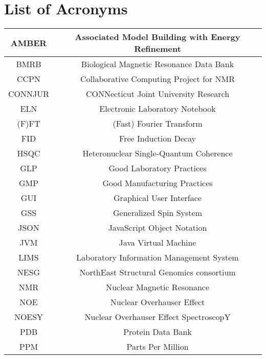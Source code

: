 \chapter*{List of Acronyms}

\begin{center}
    \begin{longtable}{ | c || c | }
    \hline
    AMBER   & Associated Model Building with Energy Refinement  \\  \hline
    BMRB    & Biological Magnetic Resonance Data Bank   \\  \hline 
    CCPN    & Collaborative Computing Project for NMR   \\  \hline 
    CONNJUR & CONNecticut Joint University Research     \\  \hline 
    ELN     & Electronic Laboratory Notebook            \\  \hline 
    (F)FT   & (Fast) Fourier Transform                  \\  \hline 
    FID     & Free Induction Decay                      \\  \hline 
    HSQC    & Heteronuclear Single-Quantum Coherence    \\  \hline 
    GLP     & Good Laboratory Practices                 \\  \hline 
    GMP     & Good Manufacturing Practices              \\  \hline 
    GUI     & Graphical User Interface                  \\  \hline 
    GSS     & Generalized Spin System                   \\  \hline
    JSON    & JavaScript Object Notation                \\  \hline 
    JVM     & Java Virtual Machine                      \\  \hline 
    LIMS    & Laboratory Information Management System  \\  \hline 
    NESG    & NorthEast Structural Genomics consortium  \\  \hline 
    NMR     & Nuclear Magnetic Resonance                \\  \hline
    NOE     & Nuclear Overhauser Effect                 \\  \hline 
    NOESY   & Nuclear Overhauser Effect SpectroscopY    \\  \hline 
    PDB     & Protein Data Bank                         \\  \hline 
    PPM     & Parts Per Million                         \\  \hline 

\end{longtable}
\end{center}
